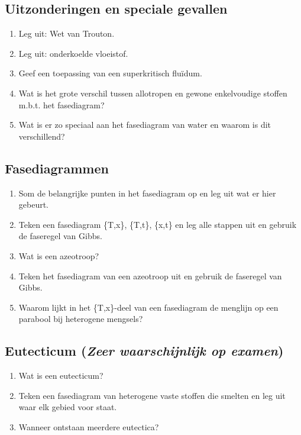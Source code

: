\documentclass[12pt]{article}
\begin{document}
    \subsection{Uitzonderingen en speciale gevallen}
    \begin{enumerate}
        \item Leg uit: Wet van Trouton.
        \item Leg uit: onderkoelde vloeistof.
        \item Geef een toepassing van een superkritisch flu\"idum.
        \item Wat is het grote verschil tussen allotropen en gewone enkelvoudige stoffen m.b.t. het fasediagram?
        \item Wat is er zo speciaal aan het fasediagram van water en waarom is dit verschillend?
    \end{enumerate}

    \subsection{Fasediagrammen}
    \begin{enumerate}
        \item Som de belangrijke punten in het fasediagram op en leg uit wat er hier gebeurt.
        \item Teken een fasediagram \{T,x\}, \{T,t\}, \{x,t\} en leg alle stappen uit en gebruik de faseregel van Gibbs.
        \item Wat is een azeotroop?
        \item Teken het fasediagram van een azeotroop uit en gebruik de faseregel van Gibbs.
        \item Waarom lijkt in het \{T,x\}-deel van een fasediagram de menglijn op een parabool bij heterogene mengsels?
    \end{enumerate}

    \subsection{Eutecticum (\emph{Zeer waarschijnlijk op examen})}
    \begin{enumerate}
        \item Wat is een eutecticum?
        \item Teken een fasediagram van heterogene vaste stoffen die smelten en leg uit waar elk gebied voor staat.
        \item Wanneer ontstaan meerdere eutectica?
    \end{enumerate}
\end{document}
